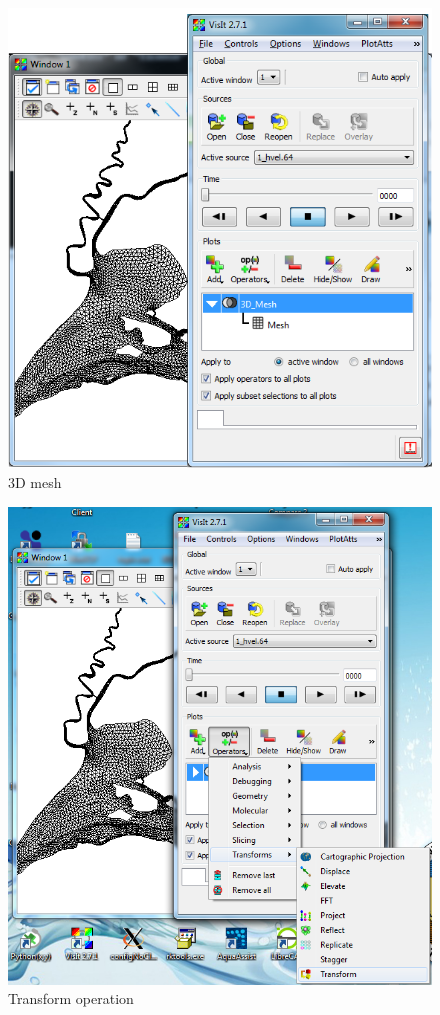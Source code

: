 \documentclass[12pt]{report}
\begin{document}
   
        \begin{figure}
        \includegraphics{mesh3D}
        \caption{3D mesh}
        \label{figure:mesh2}
        \end{figure}
       
       
        \begin{figure}
        \includegraphics{transform}
        \caption{Transform operation}
        \label{figure:transform}
        \end{figure} 
   
\end{document}
